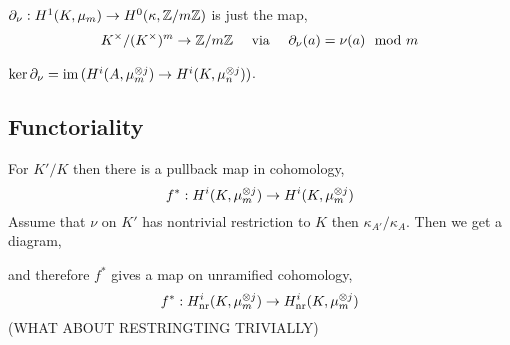 \documentclass[12pt]{article}
\begin{document}
\begin{example}
$\partial_\nu : H^1(K, \mu_m) \to H^0(\kappa, \mathbb{Z} / m \mathbb{Z})$ is just the map,
\[ K^\times / (K^\times)^m \to \mathbb{Z} / m \mathbb{Z} \quad \text{ via } \quad \partial_\nu(a) = \nu(a) \mod m \]
\end{example}

\begin{cor}
$\ker{\partial_\nu} = \operatorname{\mathrm{im}}{(H^i(A, \mu_m^{\otimes j}) \to H^i(K, \mu_n^{\otimes j}))}$.
\end{cor}

\subsection{Functoriality}

For $K' / K$ then there is a pullback map in \etale cohomology,
\[ f^* : H^i(K, \mu_m^{\otimes j}) \to H^i(K, \mu_m^{\otimes j}) \]
Assume that $\nu$ on $K'$ has nontrivial restriction to $K$ then $\kappa_{A'} / \kappa_{A}$. Then we get a diagram,
\begin{center}
\end{center}
and therefore $f^*$ gives a map on unramified cohomology,
\[ f^* : H^i_{\mathrm{nr}}(K, \mu_m^{\otimes j}) \to H^i_{\mathrm{nr}}(K, \mu_m^{\otimes j}) \]
(WHAT ABOUT RESTRINGTING TRIVIALLY)
\end{document}
